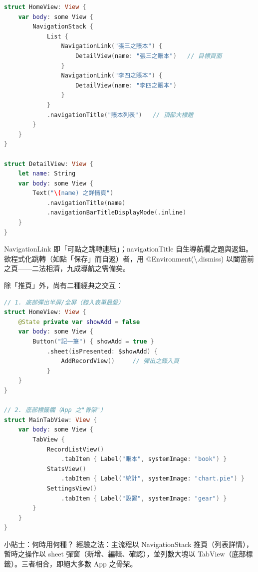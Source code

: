 \begin{lstlisting}[language=Swift]
struct HomeView: View {
    var body: some View {
        NavigationStack {
            List {
                NavigationLink("張三之賬本") {
                    DetailView(name: "張三之賬本")   // 目標頁面
                }
                NavigationLink("李四之賬本") {
                    DetailView(name: "李四之賬本")
                }
            }
            .navigationTitle("賬本列表")   // 頂部大標題
        }
    }
}

struct DetailView: View {
    let name: String
    var body: some View {
        Text("\(name) 之詳情頁")
            .navigationTitle(name)
            .navigationBarTitleDisplayMode(.inline)
    }
}
\end{lstlisting}

NavigationLink 即「可點之跳轉連結」；navigationTitle 自生導航欄之題與返鈕。欲程式化跳轉（如點「保存」而自返）者，用 @Environment(\textbackslash{}.dismiss) 以闔當前之頁——二法相濟，九成導航之需備矣。


除「推頁」外，尚有二種經典之交互：

\begin{lstlisting}[language=Swift]
// 1. 底部彈出半屏/全屏（錄入表單最愛）
struct HomeView: View {
    @State private var showAdd = false
    var body: some View {
        Button("記一筆") { showAdd = true }
            .sheet(isPresented: $showAdd) {
                AddRecordView()     // 彈出之錄入頁
            }
    }
}

// 2. 底部標籤欄（App 之"骨架"）
struct MainTabView: View {
    var body: some View {
        TabView {
            RecordListView()
                .tabItem { Label("賬本", systemImage: "book") }
            StatsView()
                .tabItem { Label("統計", systemImage: "chart.pie") }
            SettingsView()
                .tabItem { Label("設置", systemImage: "gear") }
        }
    }
}
\end{lstlisting}

\begin{tcbinfo}{小貼士：何時用何種？}
經驗之法：主流程以 NavigationStack 推頁（列表詳情），暫時之操作以 sheet 彈窗（新增、編輯、確認），並列數大塊以 TabView（底部標籤）。三者相合，即絕大多數 App 之骨架。

\end{tcbinfo}



